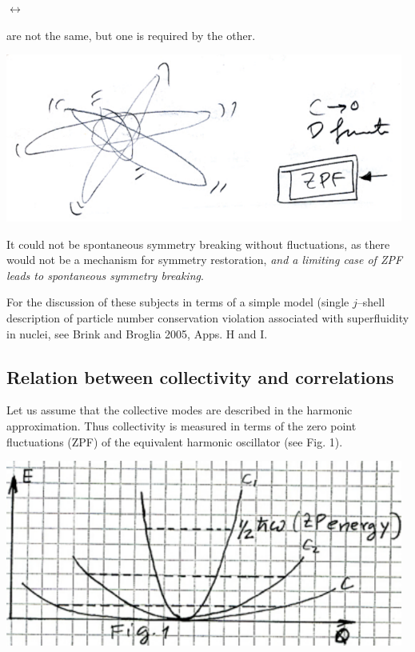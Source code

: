 \documentclass[a4paper,onecolumn,superscriptaddress,12pt,nofootinbib,twoside,raggedfooter,notitlepage]{revtex4-1}
\begin{document}
\begin{center}$\leftrightarrow$\end{center}
are not the same, but one is required by the other.

\begin{center}
	\includegraphics[width=0.98\textwidth]{figs/fig_zpf}
\end{center}

It could not be spontaneous symmetry breaking without fluctuations, as there would not be a mechanism for symmetry restoration, \emph{and a limiting case of ZPF leads to spontaneous symmetry breaking}.

For the discussion of these subjects in terms of a simple model (single $j$--shell description of particle number conservation violation associated with superfluidity in nuclei, see Brink and Broglia 2005, Apps. H and I.


\subsection{Relation between collectivity and correlations}

Let us assume that the collective modes are described in the harmonic approximation. Thus collectivity is measured in terms of the zero point fluctuations (ZPF) of the equivalent harmonic oscillator (see Fig. 1).
\begin{center}
	\includegraphics[width=0.98\textwidth]{figs/fig_zpf1}
\end{center}
\end{document}
